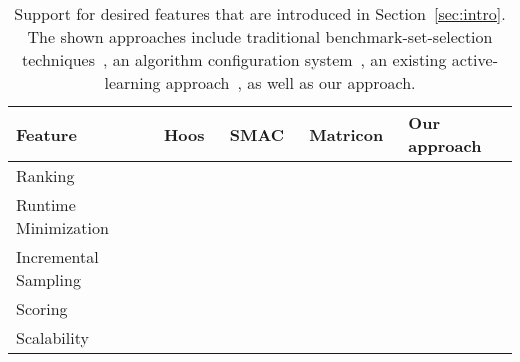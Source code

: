 \documentclass[runningheads]{llncs}
\newcommand{\cmark}{\ding{51}} %
\newcommand{\xmark}{\ding{55}}
\begin{document}
\begin{table}[tbp]
  \centering
  \begin{tabular}{
    m{}
    >{\centering\arraybackslash}m{}
    >{\centering\arraybackslash}m{}
    >{\centering\arraybackslash}m{}
    >{\centering\arraybackslash}m{}
  }
    \hline
    Feature & Hoos~\cite{HoosKSS13} & SMAC~\cite{HutterHL11} & Matricon~\cite{MatriconAFSH21} & Our approach \\
    \hline
    Ranking & \cmark & \xmark & \cmark & \cmark \\
    Runtime Minimization & \xmark & \cmark & \cmark & \cmark \\
    Incremental Sampling & \xmark & \xmark & \cmark & \cmark \\
    Scoring & \cmark & \xmark & \xmark & \cmark \\
    Scalability & \cmark & \cmark & \xmark & \cmark \\
    \hline
  \end{tabular}
  ~\\[1em]
  \caption{Support for desired features that are introduced in Section~\ref{sec:intro}.
	The shown approaches include traditional benchmark-set-selection techniques~\cite{HoosKSS13}, an algorithm configuration system~\cite{HutterHL11}, an existing active-learning approach~\cite{MatriconAFSH21}, as well as our approach.
  }
  \label{tab:requirements}
\end{table}
\end{document}
